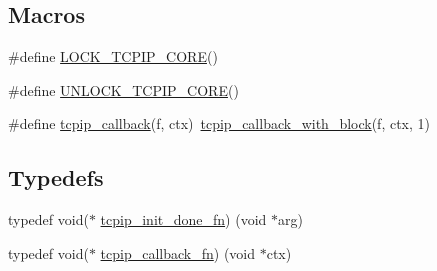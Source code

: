 \subsection*{Macros}
\begin{DoxyCompactItemize}
\item 
\#define \hyperlink{openmote-cc2538_2lwip_2src_2include_2lwip_2tcpip_8h_a4700525e737fc025fea4887b172e0c95}{L\+O\+C\+K\+\_\+\+T\+C\+P\+I\+P\+\_\+\+C\+O\+RE}()
\item 
\#define \hyperlink{openmote-cc2538_2lwip_2src_2include_2lwip_2tcpip_8h_a915effea029b9c4891e1ec635eb1826d}{U\+N\+L\+O\+C\+K\+\_\+\+T\+C\+P\+I\+P\+\_\+\+C\+O\+RE}()
\item 
\#define \hyperlink{group__lwip__os_ga7eb868a1215472ec38f3f2a04d442b9f}{tcpip\+\_\+callback}(f,  ctx)~\hyperlink{openmote-cc2538_2lwip_2src_2include_2lwip_2tcpip_8h_ab1d3ef23817d7703fa75ed67bd45ea1d}{tcpip\+\_\+callback\+\_\+with\+\_\+block}(f, ctx, 1)
\end{DoxyCompactItemize}
\subsection*{Typedefs}
\begin{DoxyCompactItemize}
\item 
typedef void($\ast$ \hyperlink{openmote-cc2538_2lwip_2src_2include_2lwip_2tcpip_8h_a5fe07216c441e27c3028bcac60fa0992}{tcpip\+\_\+init\+\_\+done\+\_\+fn}) (void $\ast$arg)
\item 
typedef void($\ast$ \hyperlink{openmote-cc2538_2lwip_2src_2include_2lwip_2tcpip_8h_a35203296bb838f3b493839ffc6e7285d}{tcpip\+\_\+callback\+\_\+fn}) (void $\ast$ctx)
\end{DoxyCompactItemize}
